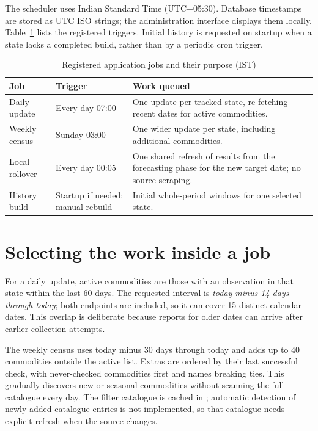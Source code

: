 \documentclass[12pt,a4paper,oneside]{report}
\numberwithin{equation}{chapter}
\numberwithin{figure}{chapter}
\numberwithin{table}{chapter}
\theoremstyle{definition}
\begin{document}
The scheduler uses Indian Standard Time (UTC+05:30). Database timestamps are stored as UTC ISO strings; the administration interface displays them locally. Table~\ref{tab:jobs} lists the registered triggers. Initial history is requested on startup when a state lacks a completed build, rather than by a periodic cron trigger.

\begin{table}[H]
\centering
\caption{Registered application jobs and their purpose (IST)}
\label{tab:jobs}
\small
\begin{tabular}{@{}p{}p{}p{}@{}}
\toprule
Job & Trigger & Work queued \\
\midrule
Daily update & Every day 07:00 & One update per tracked state, re-fetching recent dates for active commodities. \\
Weekly census & Sunday 03:00 & One wider update per state, including additional commodities. \\
Local rollover & Every day 00:05 & One shared refresh of results from the forecasting phase for the new target date; no source scraping. \\
History build & Startup if needed; manual rebuild & Initial whole-period windows for one selected state. \\
\bottomrule
\end{tabular}
\end{table}

\section{Selecting the work inside a job}
For a daily update, active commodities are those with an observation in that state within the last 60 days. The requested interval is \emph{today minus 14 days through today}; both endpoints are included, so it can cover 15 distinct calendar dates. This overlap is deliberate because reports for older dates can arrive after earlier collection attempts.

The weekly census uses today minus 30 days through today and adds up to 40 commodities outside the active list. Extras are ordered by their last successful check, with never-checked commodities first and names breaking ties. This gradually discovers new or seasonal commodities without scanning the full catalogue every day. The filter catalogue is cached in ; automatic detection of newly added catalogue entries is not implemented, so that catalogue needs explicit refresh when the source changes.
\end{document}
